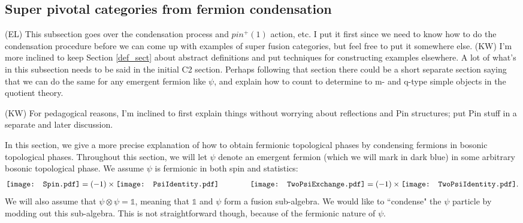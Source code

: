 \documentclass[12pt,a4paper]{article}
\newcommand{\tp}{\otimes}
\newcommand{\unit}{\mathds{1}}
\newcommand{\ethan}[1]{{\color{amethyst}\footnotesize{(EL) #1}}}
\newcommand{\kw}[1]{{\color{kwcolor}\footnotesize{(KW) #1}}}
\newcommand{\Spin}{\mathord{\vcenter{\hbox{\texttt{[image: Spin.pdf]}}}}}
\newcommand{\PsiIdentity}{\mathord{\vcenter{\hbox{\texttt{[image: PsiIdentity.pdf]}}}}}
\newcommand{\TwoPsiExchange}{\mathord{\vcenter{\hbox{\texttt{[image: TwoPsiExchange.pdf]}}}}}
\newcommand{\TwoPsiIdentity}{\mathord{\vcenter{\hbox{\texttt{[image: TwoPsiIdentity.pdf]}}}}}
\begin{document}
\subsection{Super pivotal categories from fermion condensation} \label{carefully_condensing_psi}

\ethan{This subsection goes over the condensation process and $pin^+(1)$ action, etc. I put it first since we need to know how to do the condensation procedure before we can come up with examples of super fusion categories, but feel free to put it somewhere else.}
\kw{I'm more inclined to keep Section \ref{def_sect} about abstract definitions and put techniques for 
constructing examples elsewhere.
A lot of what's in this subsection needs to be said in the initial C2 section.
Perhaps following that section there could be a short separate section saying that we can do the same
for any emergent fermion like $\psi$, 
and explain how to count to determine to m- and q-type simple objects in the quotient theory.}

\kw{For pedagogical reasons, I'm inclined to first explain things without worrying about reflections and Pin structures;
put Pin stuff in a separate and later discussion.}

In this section, we give a more precise explanation of how to obtain fermionic topological phases by condensing fermions in bosonic topological phases.
Throughout this section, we will let $\psi$ denote an emergent fermion (which we will mark in dark blue) in some arbitrary bosonic topological phase. 
We assume $\psi$ is fermionic in both spin and statistics:
\begin{align} \label{psiafermion}
\Spin = (-1) \times  \PsiIdentity
\qquad \qquad \TwoPsiExchange =  (-1) \times\TwoPsiIdentity.
\end{align}
We will also assume that $\psi\tp\psi=\unit$, meaning that $\unit$ and $\psi$ form a fusion sub-algebra.
We would like to ``condense" the $\psi$ particle by modding out this sub-algebra.
This is not straightforward though, because of the fermionic nature of $\psi$. 
\end{document}
